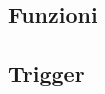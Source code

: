 \subsection{Funzioni} %

\begin{comment}
    operazione 18: calcola il guadagno mensile dato dalla differenza tra la somma delle entrate e la somma delle uscite
    operazione 19: trova il cameriere che effettua più ordini in media al giorno per decidere se promuoverlo o no
\end{comment}

\subsection{Trigger} %

\begin{comment}
    Un dipendente non può svolgere più di 6 turni a settimana.
    Un cliente non può prenotare un tavolo già prenotato.
    Il numero del tavolo deve essere compreso tra 1 e 35.
    La quantità del prodotto non può essere negativa.
\end{comment}


